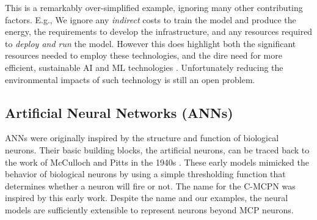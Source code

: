 

This is a remarkably over-simplified example, ignoring many other contributing factors. E.g., We ignore any \emph{indirect} costs to train the model and produce the energy, the requirements to develop the infrastructure, and any resources required to \emph{deploy and run} the model. However this does highlight both the significant resources needed to employ these technologies, and the dire need for more efficient, sustainable AI and ML technologies \parencite{DeVries2023}. Unfortunately reducing the environmental impacts of such technology is still an open problem.


\subsection{Artificial Neural Networks (ANNs)}
ANNs were originally inspired by the structure and function of biological neurons. Their basic building blocks, the artificial neurons, can be traced back to the work of McCulloch and Pitts in the 1940s \parencite{McCulloch1943}. These early models mimicked the behavior of biological neurons by using a simple thresholding function that determines whether a neuron will fire or not. The name for the C-MCPN was inspired by this early work. Despite the name and our examples, the neural models are sufficiently extensible to represent neurons beyond MCP neurons.


